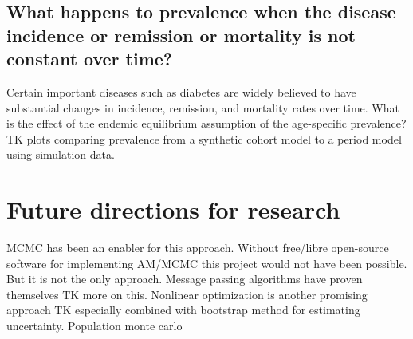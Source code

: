 \subsection{What happens to prevalence when the disease incidence or remission or mortality is not constant over time?}

Certain important diseases such as diabetes are widely believed to
have substantial changes in incidence, remission, and mortality rates
over time.  What is the effect of the endemic equilibrium assumption
of the age-specific prevalence? TK plots comparing prevalence from a
synthetic cohort model to a period model using simulation data.


\section{Future directions for research}

MCMC has been an enabler for this approach.  Without free/libre
open-source software for implementing AM/MCMC this project would not
have been possible.  But it is not the only approach.  Message passing
algorithms have proven themselves TK more on this.  Nonlinear
optimization is another promising approach TK especially combined
with bootstrap method for estimating uncertainty.  Population monte
carlo
